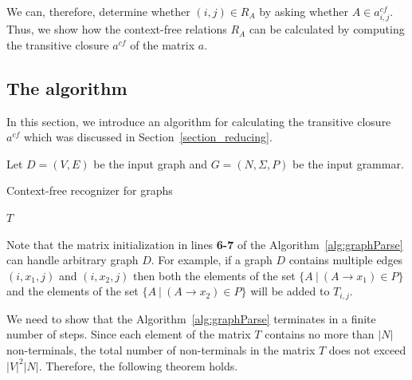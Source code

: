 We can, therefore, determine whether $(i,j) \in R_A$ by asking whether $A \in a^{cf}_{i,j}$. Thus, we show how the context-free relations $R_A$ can be calculated by computing the transitive closure $a^{cf}$ of the matrix $a$.



\subsection{The algorithm} \label{section_algorithm}
In this section, we introduce an algorithm for calculating the transitive closure $a^{cf}$ which was discussed in Section~\ref{section_reducing}.

Let $D = (V, E)$ be the input graph and $G = (N,\Sigma,P)$ be the input grammar.

\begin{algorithm}[H]
\begin{algorithmic}[1]
\caption{Context-free recognizer for graphs}
\label{alg:graphParse}
    
    \EndFor    
       
    \EndWhile
\State \Return $T$
\EndFunction
\end{algorithmic}
\end{algorithm}

Note that the matrix initialization in lines \textbf{6-7} of the Algorithm~\ref{alg:graphParse} can handle arbitrary graph $D$. For example, if a graph $D$ contains multiple edges $(i,x_1,j)$ and $(i,x_2,j)$ then both the elements of the set $\{A~|~(A \rightarrow x_1) \in P \}$ and the elements of the set $\{A~|~(A \rightarrow x_2) \in P \}$ will be added to $T_{i,j}$.

We need to show that the Algorithm~\ref{alg:graphParse} terminates in a finite number of steps. Since each element of the matrix $T$ contains no more than $|N|$ non-terminals, the total number of non-terminals in the matrix $T$ does not exceed $|V|^2|N|$. Therefore, the following theorem holds.

